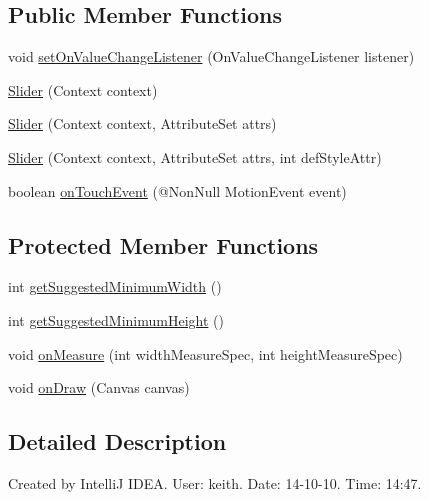 \subsection*{Public Member Functions}
\begin{DoxyCompactItemize}
\item 
void \hyperlink{classcom_1_1material_1_1widget_1_1_slider_ab7618e0c7c7385bfc33cf65a75e6eb7c}{set\+On\+Value\+Change\+Listener} (On\+Value\+Change\+Listener listener)
\item 
\hyperlink{classcom_1_1material_1_1widget_1_1_slider_a1bf99093808b7d580bb30668be92f89e}{Slider} (Context context)
\item 
\hyperlink{classcom_1_1material_1_1widget_1_1_slider_af14aa6e43ff12a5518d86c68f8080286}{Slider} (Context context, Attribute\+Set attrs)
\item 
\hyperlink{classcom_1_1material_1_1widget_1_1_slider_a74d12cddd46a012753bef2adeb9ebc61}{Slider} (Context context, Attribute\+Set attrs, int def\+Style\+Attr)
\item 
boolean \hyperlink{classcom_1_1material_1_1widget_1_1_slider_a2baf20667eb65b2146c957d1d37711e4}{on\+Touch\+Event} (@Non\+Null Motion\+Event event)
\end{DoxyCompactItemize}
\subsection*{Protected Member Functions}
\begin{DoxyCompactItemize}
\item 
int \hyperlink{classcom_1_1material_1_1widget_1_1_slider_a7c050c7e00bfab9085b8351801aa7f5f}{get\+Suggested\+Minimum\+Width} ()
\item 
int \hyperlink{classcom_1_1material_1_1widget_1_1_slider_a8c698376e16ec035a9f2f18769727bd5}{get\+Suggested\+Minimum\+Height} ()
\item 
void \hyperlink{classcom_1_1material_1_1widget_1_1_slider_a111c8f6bc3c92f39f8ecd90c8b604e9a}{on\+Measure} (int width\+Measure\+Spec, int height\+Measure\+Spec)
\item 
void \hyperlink{classcom_1_1material_1_1widget_1_1_slider_aaf389aceeaf6223a79a33c078e9e6fcd}{on\+Draw} (Canvas canvas)
\end{DoxyCompactItemize}


\subsection{Detailed Description}
Created by IntelliJ I\+D\+EA. User\+: keith. Date\+: 14-\/10-\/10. Time\+: 14\+:47. 

